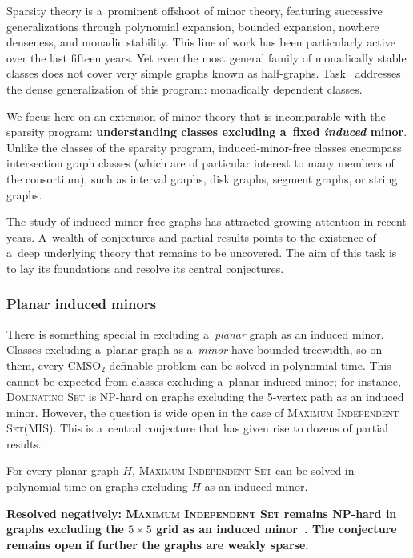 \documentclass[a4paper,11pt]{article}
\newcommand{\cmsot}{\textsf{CMSO$_2$}\xspace}
\newcommand{\mis}{\textsc{Maximum Independent Set}\xspace}
\newcommand{\smis}{\textsc{MIS}\xspace}
\newtheorem{solved-conj}[conj]{Conjecture}
\newenvironment{solved-conjecture}[1][]
{
  \if\relax\detokenize{#1}\relax\begin{solved-conj}\else\begin{solved-conj}[#1]\fi
  \begin{mdframed}[style=solvedconjecturestyle]
}
{
  \end{mdframed}\end{solved-conj}
}
\begin{document}
Sparsity theory is a~prominent offshoot of minor theory, featuring successive generalizations through polynomial expansion, bounded expansion, nowhere denseness, and monadic stability.
This line of work has been particularly active over the last fifteen years.
Yet even the most general family of monadically stable classes does not cover very simple graphs known as half-graphs.
Task~ addresses the dense generalization of this program: monadically dependent classes.    

We focus here on an extension of minor theory that is incomparable with the sparsity program: \textbf{understanding classes excluding a~fixed \emph{induced} minor}.
Unlike the classes of the sparsity program, induced-minor-free classes encompass intersection graph classes (which are of particular interest to many members of the consortium), such as interval graphs, disk graphs, segment graphs, or string graphs.

The study of induced-minor-free graphs has attracted growing attention in recent years.
A~wealth of conjectures and partial results points to the existence of a~deep underlying theory that remains to be uncovered.
The aim of this task is to lay its foundations and resolve its central conjectures.

\subsubsection{Planar induced minors}\label{subsec:planar-ind-min}

There is something special in excluding a~\emph{planar} graph as an induced minor.
Classes excluding a~planar graph as a~\emph{minor} have bounded treewidth, so on them, every \cmsot-definable problem can be solved in polynomial time.
This cannot be expected from classes excluding a~planar induced minor; for instance, \textsc{Dominating Set} is NP-hard on graphs excluding the 5-vertex path as an induced minor.
However, the question is wide open in the case of \mis (\smis).
This is a~central conjecture that has given rise to dozens of partial results.

\begin{solved-conjecture}\label{conj:dms}
For every planar graph $H$, \mis can be solved in polynomial time on graphs excluding $H$ as an induced minor.
\end{solved-conjecture}

\textbf{Resolved negatively: \mis remains NP-hard in graphs excluding the $5 \times 5$ grid as an induced minor~\cite{BonnetC26}. The conjecture remains open if further the graphs are weakly sparse.}
\end{document}
